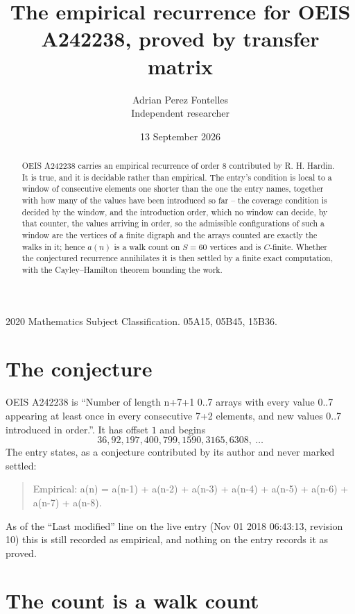 \documentclass[11pt,a4paper]{article}
\title{The empirical recurrence for OEIS A242238, proved by transfer matrix}
\author{Adrian Perez Fontelles\\ \small Independent researcher}
\date{13 September 2026}
\theoremstyle{plain}
\theoremstyle{definition}
\begin{document}
\maketitle

\begin{abstract}
OEIS A242238 carries an empirical recurrence of order $8$ contributed by R. H. Hardin. It is
true, and it is decidable rather than empirical. The entry's condition is local to a window of consecutive elements one shorter than the one the entry names, together with how many of the values have been introduced so far -- the coverage condition is decided by the window, and the introduction order, which no window can decide, by that counter, the values arriving in order, so
the admissible configurations of such a window are the vertices of a finite digraph and the
arrays counted are exactly the walks in it; hence $a(n)$ is a walk count on $S=60$ vertices
and is $C$-finite. Whether the conjectured recurrence annihilates it is then settled by a
finite exact computation, with the Cayley--Hamilton theorem bounding the work.
\end{abstract}

\noindent\small 2020 Mathematics Subject Classification. 05A15, 05B45, 15B36.\normalsize

\section{The conjecture}

OEIS A242238 is ``Number of length n+7+1 0..7 arrays with every value 0..7 appearing at least once in every consecutive 7+2 elements, and new values 0..7 introduced in order.''. It has offset $1$ and begins
\[
36, 92, 197, 400, 799, 1590, 3165, 6308,\ \dots
\]
The entry states, as a conjecture contributed by its author and never marked settled:
\begin{quote}
Empirical: a(n) = a(n-1) + a(n-2) + a(n-3) + a(n-4) + a(n-5) + a(n-6) + a(n-7) + a(n-8).
\end{quote}
As of the ``Last modified'' line on the live entry (Nov 01 2018 06:43:13, revision 10) this is still
recorded as empirical, and nothing on the entry records it as proved.

\section{The count is a walk count}
\end{document}
